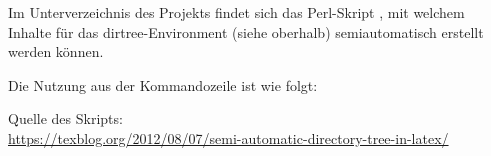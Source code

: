 \small

\begin{minipage}[t]{0.97\linewidth}
\end{minipage}

\vspace{2em}

Im Unterverzeichnis  des Projekts findet sich das Perl-Skript , mit welchem Inhalte für das dirtree-Environment (siehe oberhalb) semiautomatisch erstellt werden können.

Die Nutzung aus der Kommandozeile ist wie folgt:\\

Quelle des Skripts:\\
\url{https://texblog.org/2012/08/07/semi-automatic-directory-tree-in-latex/}
\normalsize